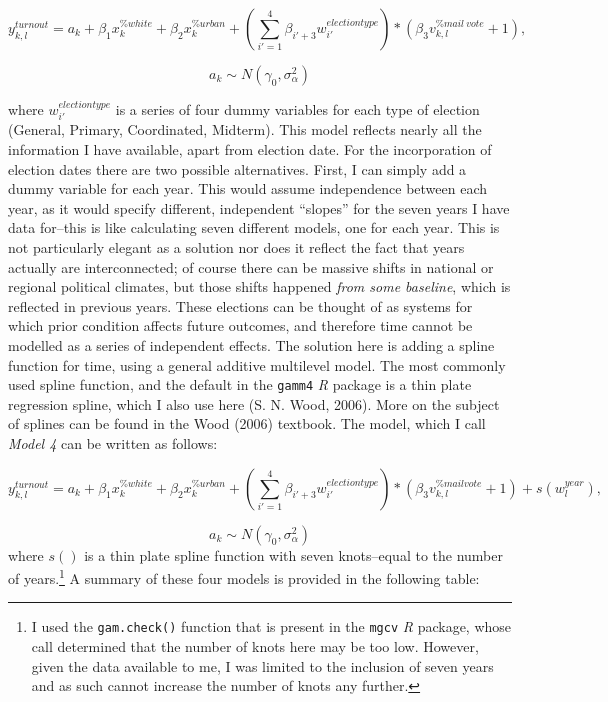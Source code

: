 \documentclass[12pt,twoside]{reedthesis}
\begin{document}
  \[y^{turnout}_{k,l} = a_{k} + \beta_{1}x_k^{\% white} + \beta_{2}x_k^{\% urban} + (\sum_{i'=1}^{4}\beta_{i'+3}w_{i'}^{election type})*(\beta_3v_{k,l}^{\% mail~vote} + 1),\]
  
  \[a_{k} \sim N(\gamma_0, \sigma_{\alpha}^2)\]
  
  where \(w_{i'}^{election type}\) is a series of four dummy variables for
  each type of election (General, Primary, Coordinated, Midterm). This
  model reflects nearly all the information I have available, apart from
  election date. For the incorporation of election dates there are two
  possible alternatives. First, I can simply add a dummy variable for each
  year. This would assume independence between each year, as it would
  specify different, independent ``slopes'' for the seven years I have
  data for--this is like calculating seven different models, one for each
  year. This is not particularly elegant as a solution nor does it reflect
  the fact that years actually are interconnected; of course there can be
  massive shifts in national or regional political climates, but those
  shifts happened \emph{from some baseline}, which is reflected in
  previous years. These elections can be thought of as systems for which
  prior condition affects future outcomes, and therefore time cannot be
  modelled as a series of independent effects. The solution here is adding
  a spline function for time, using a general additive multilevel model.
  The most commonly used spline function, and the default in the
  \texttt{gamm4} \textit{R} package is a thin plate regression spline,
  which I also use here (S. N. Wood, 2006). More on the subject of splines
  can be found in the Wood (2006) textbook. The model, which I call
  \emph{Model 4} can be written as follows:
  
  \[y^{turnout}_{k,l} = a_{k} + \beta_{1}x_k^{\% white} + \beta_{2}x_k^{\% urban} + (\sum_{i'=1}^{4}\beta_{i'+3}w_{i'}^{election type})*(\beta_3v_{k,l}^{\% mail vote} + 1) + s(w^{year}_{l}),\]
  
  \[a_{k} \sim N(\gamma_0, \sigma_{\alpha}^2)\] where \(s()\) is a thin
  plate spline function with seven knots--equal to the number of
  years.\footnote{I used the \texttt{gam.check()} function that is present
    in the \texttt{mgcv} \textit{R} package, whose call determined that
    the number of knots here may be too low. However, given the data
    available to me, I was limited to the inclusion of seven years and as
    such cannot increase the number of knots any further.} A summary of
  these four models is provided in the following table:
  
\end{document}
